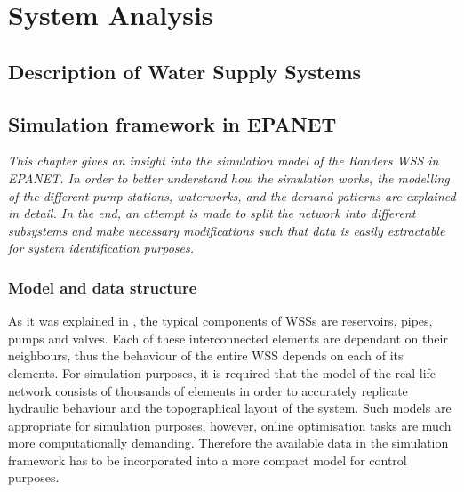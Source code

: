 
\part{System Analysis}
\label{system_analysis}

\chapter{Description of Water Supply Systems}
\label{description_of_water_supply_systems}

 





\chapter{Simulation framework in EPANET}
\label{simulation_framework_in_EPANET}

\emph{This chapter gives an insight into the simulation model of the Randers WSS in EPANET. In order to better understand how the simulation works, the modelling of the different pump stations, waterworks, and the demand patterns are explained in detail. In the end, an attempt is made to split the network into different subsystems and make necessary modifications such that data is easily extractable for system identification purposes.}


\section{Model and data structure}
\label{model_data_and_structure}

As it was explained in , the typical components of WSSs are reservoirs, pipes, pumps and valves. Each of these interconnected elements are dependant on their neighbours, thus the behaviour of the entire WSS depends on each of its elements. For simulation purposes, it is required that the model of the real-life network consists of thousands of elements in order to accurately replicate hydraulic behaviour and the topographical layout of the system. Such models are appropriate for simulation purposes, however, online optimisation tasks are much more computationally demanding. Therefore the available data in the simulation framework has to be incorporated into a more compact model for control purposes. 

